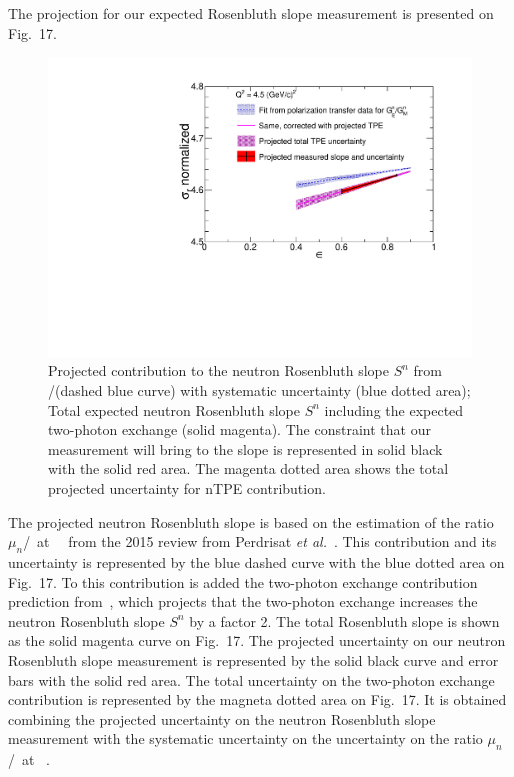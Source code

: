 The projection for our expected Rosenbluth slope measurement is presented on Fig.~17.%
%
\begin{figure}[!h]
  \centering
    \includegraphics[width=12cm]{Plots/Proj_result_multicolors.pdf}
    \caption{Projected contribution to the neutron Rosenbluth slope $S^n$ from \gen/\gmn (dashed blue curve) with systematic uncertainty (blue dotted area);
      Total expected neutron Rosenbluth slope $S^n$ including the expected two-photon exchange (solid magenta).
      The constraint that our measurement will bring to the slope is represented in solid black with the solid red area.
      The magenta dotted area shows the total projected uncertainty for nTPE contribution.}
    \label{fig:proj_results}
\end{figure}
%
The projected neutron Rosenbluth slope is based on the estimation of the ratio $\mu_n$\gen/\gmn~at ~\gevcsq~from the 2015 review from Perdrisat {\it et al.}~\cite{Punjabi:2015bba}. This contribution and its uncertainty is represented by the blue dashed curve with the blue dotted area on Fig.~17.%
To this contribution is added the two-photon exchange contribution prediction from~\cite{Blunden:2005ew}, which projects that the two-photon exchange increases the  neutron Rosenbluth slope $S^n$ by a factor 2.
The total Rosenbluth slope is shown as the solid magenta curve on Fig.~17.%
The projected uncertainty on our neutron Rosenbluth slope measurement is represented by the solid black curve and error bars with the solid red area.
The total uncertainty on the two-photon exchange contribution is represented by the magneta dotted area on Fig.~17.%
It is obtained combining the projected uncertainty on the neutron Rosenbluth slope measurement with the systematic uncertainty on the uncertainty on the ratio $\mu_n$\gen/\gmn~at ~\gevcsq.

